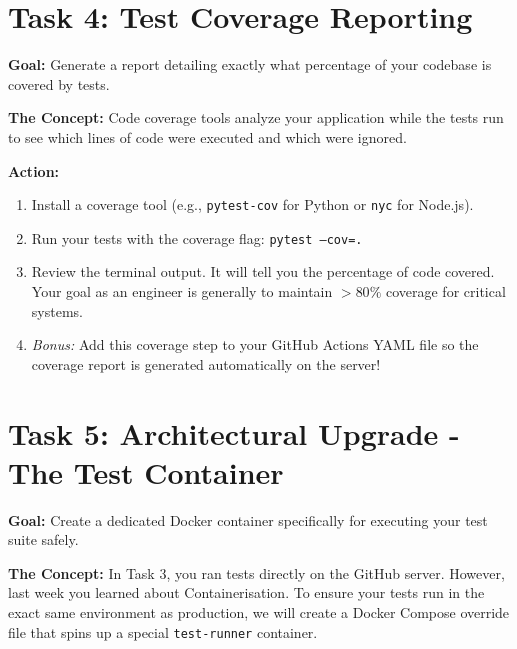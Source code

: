 \documentclass[a4paper,12pt]{article}
\begin{document}

\section*{Task 4: Test Coverage Reporting}

\textbf{Goal:} Generate a report detailing exactly what percentage of your codebase is covered by tests.

\textbf{The Concept:} Code coverage tools analyze your application while the tests run to see which lines of code were executed and which were ignored. 

\vspace{0.3cm}
\textbf{Action:}
\begin{enumerate}
    \item Install a coverage tool (e.g., \texttt{pytest-cov} for Python or \texttt{nyc} for Node.js).
    \item Run your tests with the coverage flag: \texttt{pytest --cov=.} 
    \item Review the terminal output. It will tell you the percentage of code covered. Your goal as an engineer is generally to maintain $>80\%$ coverage for critical systems.
    \item \textit{Bonus:} Add this coverage step to your GitHub Actions YAML file so the coverage report is generated automatically on the server!
\end{enumerate}


\section*{Task 5: Architectural Upgrade - The Test Container}

\textbf{Goal:} Create a dedicated Docker container specifically for executing your test suite safely.

\textbf{The Concept:} In Task 3, you ran tests directly on the GitHub server. However, last week you learned about Containerisation. To ensure your tests run in the exact same environment as production, we will create a Docker Compose override file that spins up a special \texttt{test-runner} container.
\end{document}
